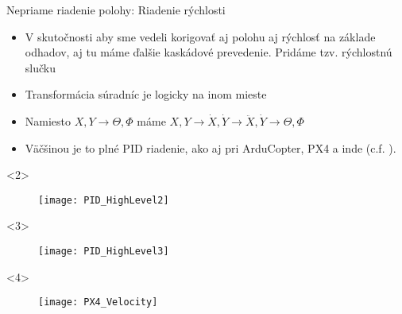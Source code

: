   \begin{frame}[t]{Nepriame riadenie polohy: Riadenie rýchlosti}
\begin{itemize}
\item<1-> V skutočnosti aby sme vedeli korigovať aj polohu aj rýchlosť na základe odhadov, aj tu máme ďalšie kaskádové prevedenie. Pridáme tzv. rýchlostnú slučku
\item<2-> Transformácia súradníc je logicky na inom mieste
\item<3-> Namiesto $X,Y\rightarrow\Theta,\Phi$ máme $X,Y\rightarrow \dot{X},\dot{Y}\rightarrow \ddot{X},\dot{Y}\rightarrow\Theta,\Phi$
\item<4->  Väčšinou je to plné PID riadenie, ako aj pri ArduCopter, PX4 a inde (c.f. \cite{Saha2020}).
\end{itemize}

  \begin{onlyenv}<2>
  \begin{figure}
\centering
  \texttt{[image: PID\_HighLevel2]}\\
\end{figure}
\end{onlyenv}


  \begin{onlyenv}<3>
  \begin{figure}
\centering
  \texttt{[image: PID\_HighLevel3]}\\
\end{figure}
\end{onlyenv}


  \begin{onlyenv}<4>
  \begin{figure}
\centering
  \texttt{[image: PX4\_Velocity]}\\
\end{figure}
\end{onlyenv}
  \end{frame}


